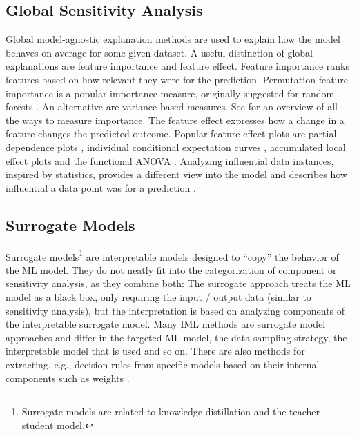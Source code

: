 \documentclass[runningheads]{llncs}
\begin{document}
\subsection{Global Sensitivity Analysis}

Global model-agnostic explanation methods are used to explain how the model behaves on average for some given dataset.
A useful distinction of global explanations are feature importance and feature effect.
Feature importance ranks features based on how relevant they were for the prediction.
Permutation feature importance \cite{fisher2019all,casalicchio2018visualizing} is a popular importance measure, originally suggested for random forests \cite{breiman2001random}.
An alternative are variance based measures.
See \cite{wei2015variable} for an overview of all the ways to measure importance.
The feature effect expresses how a change in a feature changes the predicted outcome.
Popular feature effect plots are partial dependence plots \cite{friedman2001greedy}, individual conditional expectation curves \cite{goldstein2015peeking}, accumulated local effect plots \cite{apley2016visualizing} and the functional ANOVA \cite{hooker2007generalized}.
Analyzing influential data instances, inspired by statistics, provides a different view into the model and describes how influential a data point was for a prediction \cite{koh2017understanding}.


\subsection{Surrogate Models}

Surrogate models\footnote{Surrogate models are related to knowledge distillation and the teacher-student model.} are interpretable models designed to \enquote{copy} the behavior of the ML model.
They do not neatly fit into the categorization of component or sensitivity analysis, as they combine both:
The surrogate approach treats the ML model as a black box, only requiring the input / output data  (similar to sensitivity analysis), but the interpretation is based on analyzing components of the interpretable surrogate model.
Many IML methods are surrogate model approaches \cite{puri2017magix,molnar2019,ming2018rulematrix,ribeiro2016should,frosst2017distilling,bastani2017interpreting,craven1996extracting,krishnan2017palm} and differ in the targeted ML model, the data sampling strategy, the interpretable model that is used and so on.
There are also methods for extracting, e.g., decision rules from specific models based on their internal components such as weights \cite{andrews1995survey,augasta2012rule}.
\end{document}
